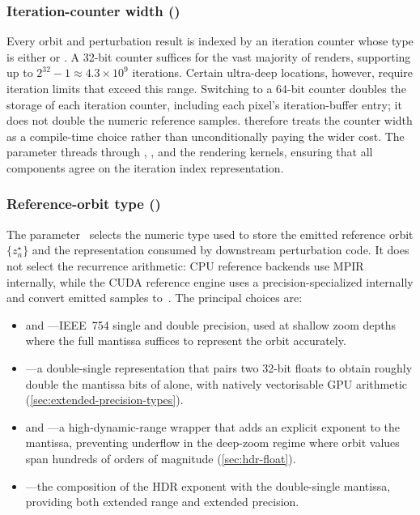 \subsubsection{Iteration-counter width ()}
\label{subsec:template-itertype}

Every orbit and perturbation result is indexed by an iteration counter
whose type is either  or .  A 32-bit
counter suffices for the vast majority of renders, supporting up to
$2^{32}-1 \approx 4.3\times10^{9}$ iterations.  Certain ultra-deep
locations, however, require iteration limits that exceed this range.
Switching to a 64-bit counter doubles the storage of each iteration counter,
including each pixel's iteration-buffer entry; it does not double the numeric
reference samples. \FractalShark{} therefore treats the counter
width as a compile-time choice rather than unconditionally paying the
wider cost.  The  parameter threads through
, , and the rendering
kernels, ensuring that all components agree on the iteration index
representation.


\subsubsection{Reference-orbit type ()}
\label{subsec:template-t}

The parameter~ selects the numeric type used to store the emitted
reference orbit $\{z_n^\star\}$ and the representation consumed by downstream
perturbation code.  It does not select the recurrence arithmetic: CPU reference
backends use MPIR internally, while the CUDA reference engine uses a
precision-specialized  internally and convert emitted samples
to~.
The principal choices are:

\begin{itemize}
  \item {} and ---IEEE~754 single and double
        precision, used at shallow zoom depths where the full mantissa
        suffices to represent the orbit accurately.
  \item {}---a double-single representation
        that pairs two 32-bit floats to obtain roughly double the
        mantissa bits of  alone, with natively vectorisable
        GPU arithmetic (\cref{sec:extended-precision-types}).
  \item {} and ---a
        high-dynamic-range wrapper that adds an explicit exponent to the
        mantissa, preventing underflow in the deep-zoom regime where
        orbit values span hundreds of orders of magnitude
        (\cref{sec:hdr-float}).
  \item {}---the composition of
        the HDR exponent with the double-single mantissa, providing
        both extended range and extended precision.
\end{itemize}

